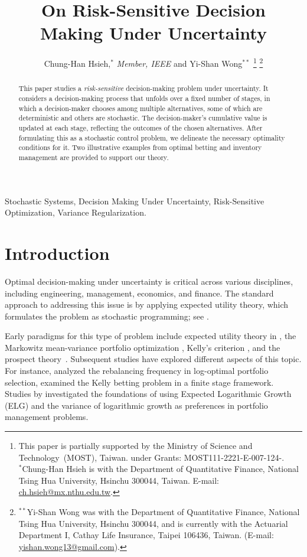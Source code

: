 \documentclass[letterpaper, 10 pt, journal, twoside]{IEEEtran}  %
\title{On Risk-Sensitive
Decision  \\ Making Under Uncertainty}
\author{\large Chung-Han Hsieh,$^{*}$ \textit{Member, IEEE} and Yi-Shan Wong${}^{**}$%
	\thanks{This paper is partially supported by the Ministry of Science and Technology~(MOST), Taiwan. under Grants:  MOST111-2221-E-007-124-.\\ ${}^*$Chung-Han Hsieh is with the Department of Quantitative Finance, National Tsing Hua University, Hsinchu 300044, Taiwan. E-mail: \href{mailto: ch.hsieh@mx.nthu.edu.tw}{ch.hsieh@mx.nthu.edu.tw}. } 
	\thanks{\hskip -10pt ${}^{**}$Yi-Shan Wong was with the Department of Quantitative Finance, National Tsing Hua University, Hsinchu 300044, and is currently with the Actuarial Department I, Cathay Life Insurance, Taipei 106436, Taiwan. (E-mail: \href{matilto: yishan.wong13@gmail.com}{yishan.wong13@gmail.com}).}
}
\begin{document}
	
	
	
	\maketitle
	\thispagestyle{empty}
	\pagestyle{empty}
	
	
\begin{abstract} 
    This paper studies a {\em risk-sensitive} decision-making problem under uncertainty. It considers a decision-making process that unfolds over a fixed number of stages, in which a decision-maker chooses among multiple alternatives, some of which are deterministic and others are stochastic. The decision-maker's cumulative value is updated at each stage, reflecting the outcomes of the chosen alternatives. After formulating this as a stochastic control problem, we delineate the necessary optimality conditions for it. Two illustrative examples from optimal betting and inventory management are provided to support our theory.
\end{abstract}
	
\vspace{3mm}
\begin{IEEEkeywords}
Stochastic Systems, Decision Making Under Uncertainty, Risk-Sensitive Optimization, Variance Regularization. 
\end{IEEEkeywords}
	
	
\section{Introduction}\label{section: introduction}
Optimal decision-making under uncertainty is critical across various disciplines, including engineering, management, economics, and finance. The standard approach to addressing this issue is by applying expected utility theory, which formulates the problem as stochastic programming; see \cite{shapiro2021lectures, bertsekas2012dynamic}.


Early paradigms for this type of problem include expected utility theory in \cite{von2007theory}, the Markowitz mean-variance portfolio optimization \cite{Markowitz_1952},  Kelly's criterion \cite{Kelly_1956, thorp2006kelly}, and the prospect theory~\cite{kahneman1979prospect}. Subsequent studies have explored different aspects of this topic. For instance, \cite{kuhn2010analysis} analyzed the rebalancing frequency in log-optimal portfolio selection, \cite{wu2020analysis} examined the Kelly betting problem in a finite stage framework. Studies by \cite{luenberger1993preference, luenberger2013investment} investigated the foundations of using Expected Logarithmic Growth (ELG) and the variance of logarithmic growth as preferences in portfolio management problems. 
\end{document}
